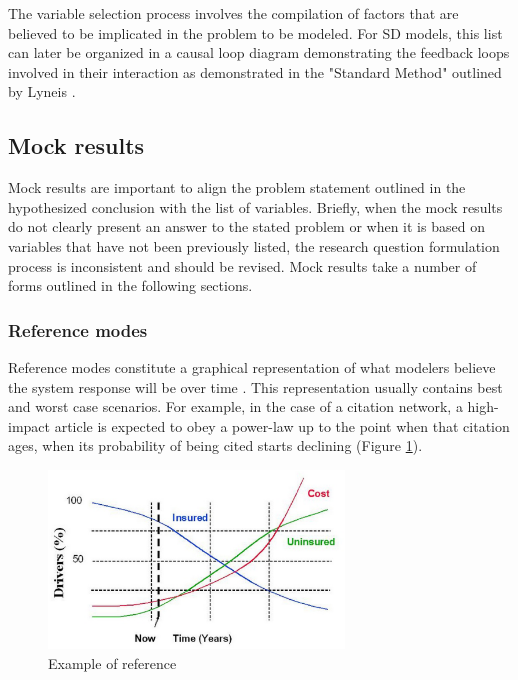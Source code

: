 \documentclass[11pt]{article}
\begin{document}
The variable selection process involves the compilation of factors that are believed to be implicated in the problem to be modeled.  For SD models, this list can later be organized in a causal loop diagram demonstrating the feedback loops involved in their interaction as demonstrated in the "Standard Method" outlined by Lyneis \cite {PenaLyneis2009}. 

\subsection{Mock results}

Mock results are important to align the problem statement outlined in the hypothesized conclusion with the list of variables.  Briefly, when the mock results do not clearly present an answer to the stated problem or when it is based on variables that have not been previously listed, the research question formulation process is inconsistent and should be revised.  Mock results take a number of forms outlined in the following sections.

\subsubsection{Reference modes}
Reference modes constitute a graphical representation of what modelers believe the system response will be over time \cite {PenaLyneis2009}.  This representation usually contains best and worst case scenarios. For example, in the case of a citation network, a high-impact article is expected to obey a power-law up to the point when that citation ages, when its probability of being cited starts declining (Figure \ref{fig:figart}).


\begin{figure} [htbp]
   \centering
   \includegraphics[width=0.70\textwidth]{figart.ps}
  \caption{Example of reference}
  \label{fig:figart}
\end{figure}
\end{document}
